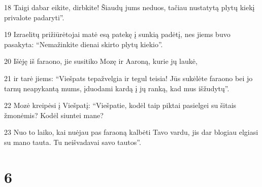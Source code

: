 \par 18 Taigi dabar eikite, dirbkite! Šiaudų jums neduos, tačiau nustatytą plytų kiekį privalote padaryti”. 
\par 19 Izraelitų prižiūrėtojai matė esą patekę į sunkią padėtį, nes jiems buvo pasakyta: “Nemažinkite dienai skirto plytų kiekio”. 
\par 20 Išėję iš faraono, jie susitiko Mozę ir Aaroną, kurie jų laukė, 
\par 21 ir tarė jiems: “Viešpats tepažvelgia ir tegul teisia! Jūs sukėlėte faraono bei jo tarnų neapykantą mums, įduodami kardą į jų ranką, kad mus išžudytų”. 
\par 22 Mozė kreipėsi į Viešpatį: “Viešpatie, kodėl taip piktai pasielgei su šitais žmonėmis? Kodėl siuntei mane? 
\par 23 Nuo to laiko, kai nuėjau pas faraoną kalbėti Tavo vardu, jis dar blogiau elgiasi su mano tauta. Tu neišvadavai savo tautos”.



\chapter{6}


